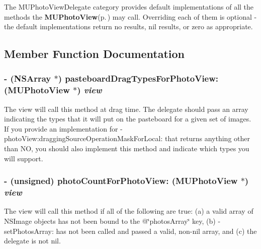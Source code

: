 The MUPhoto\-View\-Delegate category provides default implementations of all the methods the {\bf MUPhoto\-View}{\rm (p.\,\pageref{interface_m_u_photo_view})} may call. Overriding each of them is optional - the default implementations return no results, nil results, or zero as appropriate. 



\subsection{Member Function Documentation}
\subsubsection{\setlength{\rightskip}{0pt plus 5cm}- (NSArray $\ast$) pasteboard\-Drag\-Types\-For\-Photo\-View: ({\bf MUPhoto\-View} $\ast$) {\em view}}\label{category_n_s_object(_m_u_photo_view_delegate)_3c401ecbd6bc8839e0886e4c672fbce6}


The view will call this method at drag time. The delegate should pass an array indicating the types that it will put on the pasteboard for a given set of images. If you provide an implementation for -photo\-View:dragging\-Source\-Operation\-Mask\-For\-Local: that returns anything other than NO, you should also implement this method and indicate which types you will support. 
\subsubsection{\setlength{\rightskip}{0pt plus 5cm}- (unsigned) photo\-Count\-For\-Photo\-View: ({\bf MUPhoto\-View} $\ast$) {\em view}}\label{category_n_s_object(_m_u_photo_view_delegate)_5012fd973adbcb5165b0a830b46100f0}


The view will call this method if all of the following are true: (a) a valid array of NSImage objects has not been bound to the @\char`\"{}photos\-Array\char`\"{} key, (b) -set\-Photos\-Array: has not been called and passed a valid, non-nil array, and (c) the delegate is not nil. 
